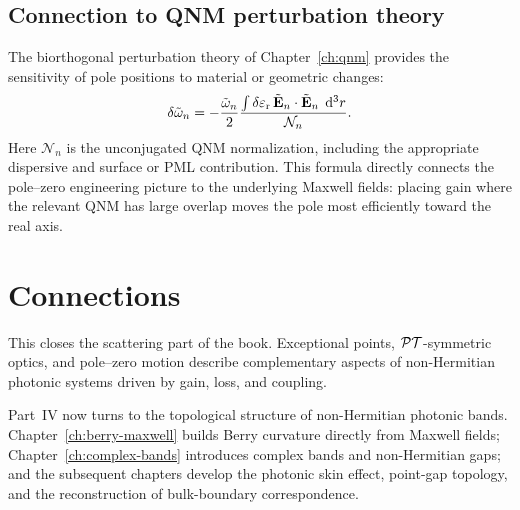 \subsection{Connection to QNM perturbation theory}
\label{ssec:pole-zero-qnm}

The biorthogonal perturbation theory of Chapter~\ref{ch:qnm} provides
the sensitivity of pole positions to material or geometric changes:
\begin{equation}
 \delta\tilde{\omega}_n = -\frac{\tilde{\omega}_n}{2}
 \frac{\int \delta\varepsilon_{\mathrm{r}}\,\tilde{\mathbf{E}}_n\cdot\tilde{\mathbf{E}}_n\;\mathop{}\!\mathrm{d}^3r}
 {\mathcal{N}_n}.
 \label{eq:pole-shift-perturbation}
\end{equation}
Here $\mathcal{N}_n$ is the unconjugated QNM normalization, including the
appropriate dispersive and surface or PML contribution. This formula
directly connects the pole--zero engineering picture to the underlying
Maxwell fields: placing gain where the relevant QNM has large overlap
moves the pole most efficiently toward the real axis.


\section{Connections}
\label{sec:ch10-forward}

This closes the scattering part of the book. Exceptional points,
$\mathcal{PT}$-symmetric optics, and pole--zero motion describe complementary
aspects of non-Hermitian photonic systems driven by gain, loss, and
coupling.

Part~IV now turns to the topological structure of non-Hermitian photonic
bands. Chapter~\ref{ch:berry-maxwell} builds Berry curvature directly
from Maxwell fields; Chapter~\ref{ch:complex-bands} introduces complex
bands and non-Hermitian gaps; and the subsequent chapters develop the
photonic skin effect, point-gap topology, and the reconstruction of
bulk-boundary correspondence.
